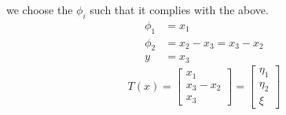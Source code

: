 we choose the $\phi_i$ such that it complies with the above.
\begin{equation}
        \begin{split}
                \phi_1 &= x_1 \\
                \phi_2 &= x_2 - x_3 = x_3 - x_2 \\
                y &= x_3
        \end{split}
\end{equation}
\begin{equation}
        T(x) = 
        \begin{bmatrix}
                x_1 \\
                x_3 - x_2 \\
                x_3
        \end{bmatrix}
        =
        \begin{bmatrix}
                \eta_1 \\
                \eta_2 \\
                \xi
        \end{bmatrix}
\end{equation}
